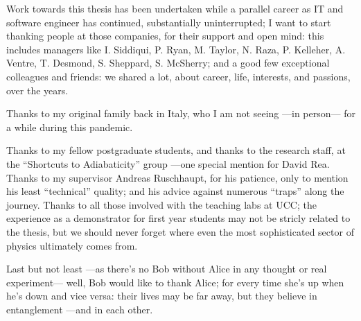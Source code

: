 Work towards this thesis has been undertaken while a parallel career
as IT and software engineer has continued,
substantially uninterrupted;
I want to start thanking people at those companies, for their support and open mind:
this includes managers like I. Siddiqui, P. Ryan, M. Taylor, N. Raza, P. Kelleher, A. Ventre, T. Desmond, S. Sheppard, S. McSherry;
and a good few exceptional colleagues and friends: we shared a lot, about career, life, interests, and passions, over the years.

Thanks to my original family back in Italy,
who I am not seeing ---in person--- for a while during this pandemic.

Thanks to my fellow postgraduate students,
and thanks to the research staff,
at the ``Shortcuts to Adiabaticity'' group
---one special mention for David Rea.
%
Thanks to my supervisor Andreas Ruschhaupt, for his patience,
only to mention his least ``technical'' quality;
and his advice against numerous ``traps'' along the journey.
%
Thanks to all those involved with the teaching labs at UCC;
the  experience as a demonstrator for first year students may not be stricly related to the thesis,
but we should never forget where even the most sophisticated sector of physics
ultimately comes from.

Last but not least ---as there's no Bob without Alice in any thought or real experiment---
well, Bob would like to thank Alice;
for every time she’s up when he’s down and vice versa:
their lives may be far away, but they believe in entanglement ---and in each other.
